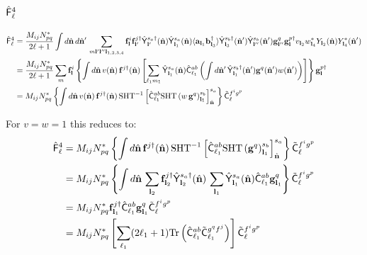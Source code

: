 \documentclass[a4paper,10pt]{article}
\newcommand{\nv}{\hat{\bf n}}
\begin{document}
  \subsection{$\hat{\sf F}^4_\ell$}
    \begin{align}\nonumber
     \hat{\sf F}^4_\ell
     &=\frac{M_{ij}N^*_{pq}}{2\ell+1}\int d\nv\,d\nv'\,\sum_{m{\bf l}'{\bf l}''{\bf l}_{1,2,3,4}}
     {\bf f}^i_{\bf l}{\bf f}^{j\dag}_{{\bf l}'}\hat{\sf Y}^{s_a\dag}_{\bf l'}(\nv)\hat{\sf Y}^{s_a}_{{\bf l}_1}(\nv)\langle{\bf a}_{{\bf l}_1}{\bf b}^\dag_{{\bf l}_3}\rangle\hat{\sf Y}^{s_b\dag}_{{\bf l}_3}(\nv')\hat{\sf Y}^{s_b}_{{\bf l}''}(\nv'){\bf g}^q_{{\bf l}''}{\bf g}^{p\dag}_{\bf l}v_{{\bf l}_2}w^*_{{\bf l}_4}Y_{{\bf l}_2}(\nv)Y^*_{{\bf l}_4}(\nv')\\\nonumber
     &=\frac{M_{ij}N^*_{pq}}{2\ell+1}\sum_{m}
     {\bf f}^i_{\bf l}\left\{\int d\nv\,v(\nv)\,{\bf f}^{j\dag}(\nv)\left[\sum_{\ell_1m_1}\hat{\sf Y}^{s_a}_{{\bf l}_1}(\nv)\hat{\sf C}^{ab}_{\ell_1}\left(\int d\nv'\,\hat{\sf Y}^{s_b\dag}_{{\bf l}_1}(\nv'){\bf g}^q(\nv')w(\nv')\right)\right]\right\}{\bf g}^{p\dag}_{\bf l}\\\label{eq:bias_4}
     &=M_{ij}N^*_{pq}
     \left\{\int d\nv\,v(\nv)\,{\bf f}^{j\dag}(\nv)\,{\rm SHT}^{-1}\left[\hat{\sf C}^{ab}_{\ell_1}{\rm SHT}\left(w\,{\bf g}^q\right)^{s_b}_{{\bf l}_1}\right]^{s_a}_{\nv}\right\}\tilde{\sf C}^{f^ig^p}_\ell
    \end{align}

    For $v=w=1$ this reduces to:
    \begin{align}\nonumber
     \hat{\sf F}^4_\ell
     &=M_{ij}N^*_{pq}\left\{\int d\nv\,{\bf f}^{j\dag}(\nv)\,{\rm SHT}^{-1}\left[\hat{\sf C}^{ab}_{\ell_1}{\rm SHT}\left({\bf g}^q\right)^{s_b}_{{\bf l}_1}\right]^{s_a}_{\nv}\right\}\tilde{\sf C}^{f^ig^p}_\ell\\\nonumber
     &=M_{ij}N^*_{pq}\left\{\int d\nv\,\sum_{{\bf l}_2}{\bf f}^{j\dag}_{{\bf l}_2}\hat{\sf Y}^{s_a\dag}_{{\bf l}_2}(\nv)\,\sum_{{\bf l}_1}\hat{\sf Y}^{s_a}_{{\bf l}_1}(\nv)\hat{\sf C}^{ab}_{\ell_1}{\bf g}^q_{{\bf l}_1}\right\}\tilde{\sf C}^{f^ig^p}_\ell\\\nonumber
     &=M_{ij}N^*_{pq}{\bf f}^{j\dag}_{{\bf l}_1}\hat{\sf C}^{ab}_{\ell_1}{\bf g}^q_{{\bf l}_1}\tilde{\sf C}^{f^ig^p}_\ell\\\nonumber
     &=M_{ij}N^*_{pq}\left[\sum_{\ell_1}(2\ell_1+1){\rm Tr}\left(\hat{\sf C}^{ab}_{\ell_1}\tilde{\sf C}^{g^qf^j}_{\ell_1}\right)\right]\tilde{\sf C}^{f^ig^p}_\ell
    \end{align}
\end{document}
